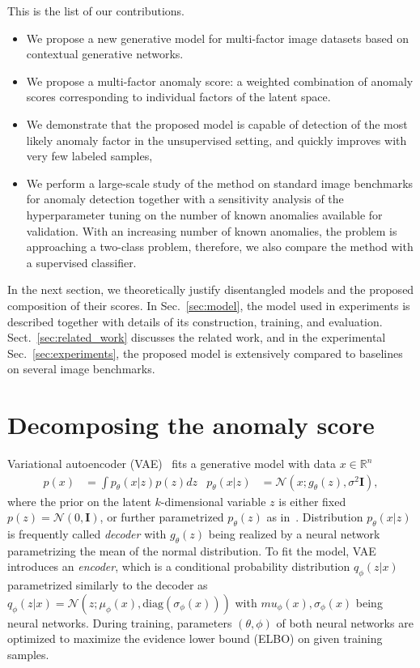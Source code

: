 This is the list of our contributions. 
\begin{itemize}
    \item We propose a new generative model for multi-factor image datasets based on contextual generative networks.
    \item We propose a multi-factor anomaly score: a weighted combination of  anomaly scores corresponding to individual factors of the latent space.
    \item We demonstrate that the proposed model is capable of detection of the most likely anomaly factor in the unsupervised setting, and quickly improves with very few labeled samples,
    \item We perform a large-scale study of the method on standard image benchmarks for anomaly detection together with a sensitivity analysis of the hyperparameter tuning on the number of known anomalies available for validation. With an increasing number of known anomalies, the problem is approaching a two-class problem, therefore, we also compare the method with a supervised classifier.
\end{itemize}

In the next section, we theoretically justify disentangled models and the proposed composition of their scores. In Sec.~\ref{sec:model}, the model used in experiments is described together with details of its construction, training, and evaluation. Sect.~\ref{sec:related_work} discusses the related work, and in the experimental Sec.~\ref{sec:experiments}, the proposed model is extensively compared to baselines on several image benchmarks.

\section{Decomposing the anomaly score} 
\label{sec:theory}
Variational autoencoder (VAE)~\cite{kingma2013vae} fits a generative model with data $x \in \mathbb{R}^n$
\begin{align}
p(x) & = \int p_{\theta}(x \vert z)p(z)dz & p_{\theta}(x\vert z) & =\mathcal{N}(x;g_{\theta}(z),\sigma^{2} \mathbf{I}),\label{eq:vae}
\end{align}
where the prior on the latent $k$-dimensional variable $z$ is either fixed $p(z)=\mathcal{N}(0,\mathbf{I})$, or further parametrized $p_{\theta}(z)$ as in~\cite{tomczak2017vae}. Distribution $p_{\theta}(x\vert z)$ is frequently called \emph{decoder} with $g_{\theta}(z)$ being realized by a neural network parametrizing the mean of the normal distribution. To fit the model, VAE introduces an \emph{encoder}, which is a conditional probability distribution $q_{\phi}(z\vert x)$ parametrized similarly to the decoder as $q_{\phi}(z\vert x)=\mathcal{N}(z;\mu_{\phi}(x),\text{diag}(\sigma_{\phi}(x)))$ with $mu_{\phi}(x), \sigma_{\phi}(x)$ being neural networks. During training, parameters $(\theta,\phi)$ of both neural networks are optimized to maximize the evidence lower bound (ELBO) on given training samples.

